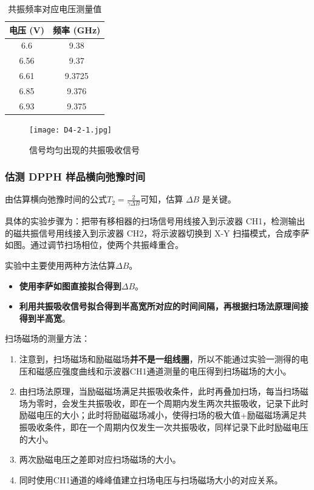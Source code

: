 \documentclass[dvipsnames, svgnames,a4paper,11pt]{article}
\begin{document}
		\begin{table}[ht]
			\centering
			\begin{tabular}{|c|c|}
			\hline
			\textbf{电压 (V)} & \textbf{频率 (GHz)} \\
			\hline
			6.6  & 9.38 \\
			6.56 & 9.37 \\
			6.61 & 9.3725 \\
			6.85 & 9.376 \\
			6.93 & 9.375 \\
			\hline
			\end{tabular}
			\caption{共振频率对应电压测量值}
			\label{tbl:D4-1-2}
		\end{table}
			

		\begin{figure}[htbp]
			\centering
			\texttt{[image: D4-2-1.jpg]}
			\caption{信号均匀出现的共振吸收信号}
			\label{fig:D4-2-1}
		\end{figure}




	\subsubsection{估测 DPPH 样品横向弛豫时间}

		由估算横向弛豫时间的公式$T_2 = \frac{2}{\gamma \Delta B}$可知，估算 $\Delta B$ 是关键。

		具体的实验步骤为：把带有移相器的扫场信号用线接入到示波器 CH1，检测输出的磁共振信号用线接入到示波器 CH2，将示波器切换到 X-Y 扫描模式，合成李萨如图。通过调节扫场相位，使两个共振峰重合。
		
		实验中主要使用两种方法估算$\Delta B$。
		\begin{itemize}
			\item \textbf{使用李萨如图直接拟合得到$\Delta B$}。
			
			\item \textbf{利用共振吸收信号拟合得到半高宽所对应的时间间隔，再根据扫场法原理间接得到半高宽}。
		\end{itemize}

		扫场磁场的测量方法：
		\begin{enumerate}
			\item 注意到，扫场磁场和励磁磁场\textbf{并不是一组线圈}，所以不能通过实验一测得的电压和磁感应强度曲线和示波器CH1通道测量的电压得到扫场磁场的大小。
			\item 由扫场法原理，当励磁磁场满足共振吸收条件，此时再叠加扫场，每当扫场磁场为零时，会发生共振吸收，即在一个周期内发生两次共振吸收，记录下此时励磁电压的大小；此时将励磁磁场减小，使得扫场的极大值+励磁磁场满足共振吸收条件，即在一个周期内仅发生一次共振吸收，同样记录下此时励磁电压的大小。
			\item 两次励磁电压之差即对应扫场磁场的大小。
			\item 同时使用CH1通道的峰峰值建立扫场电压与扫场磁场大小的对应关系。
		\end{enumerate}
\end{document}

